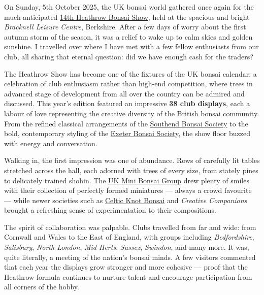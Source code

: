 \label{2025-10-show}
\noindent
On Sunday, 5th October 2025, the UK bonsai world gathered once again for the much\--anticipated \href{https://heathrowbonsai.weebly.com}{14th Heathrow Bonsai Show}, held at the spacious and bright \textit{Bracknell Leisure Centre}, Berkshire.
After a few days of worry about the first autumn storm of the season, it was a relief to wake up to calm skies and golden sunshine.
I travelled over where I have met with a few fellow enthusiasts from our club, all sharing that eternal question: did we have enough cash for the traders?

The Heathrow Show has become one of the fixtures of the UK bonsai calendar: a celebration of club enthusiasm rather than high\--end competition, where trees in advanced stage of development from all over the country can be admired and discussed.
This year's edition featured an impressive \textbf{38 club displays}, each a labour of love representing the creative diversity of the British bonsai community.
From the refined classical arrangements of the \href{https://www.southendbonsai.com}{Southend Bonsai Society} to the bold, contemporary styling of the \href{https://exeterbonsaisociety.com}{Exeter Bonsai Society}, the show floor buzzed with energy and conversation.

Walking in, the first impression was one of abundance.
Rows of carefully lit tables stretched across the hall, each adorned with trees of every size, from stately pines to delicately trained shohin.
The \href{https://ukminibonsaigroup.weebly.com}{UK Mini Bonsai Group} drew plenty of smiles with their collection of perfectly formed miniatures --- always a crowd favourite --- while newer societies such as \href{http://www.celticknotbonsai.co.uk}{Celtic Knot Bonsai} and \textit{Creative Companions} brought a refreshing sense of experimentation to their compositions.

The spirit of collaboration was palpable.
Clubs travelled from far and wide: from Cornwall and Wales to the East of England, with groups including \textit{Bedfordshire}, \textit{Salisbury}, \textit{North London}, \textit{Mid\--Herts}, \textit{Sussex}, \textit{Swindon}, and many more.
It was, quite literally, a meeting of the nation's bonsai minds.
A few visitors commented that each year the displays grow stronger and more cohesive --- proof that the Heathrow formula continues to nurture talent and encourage participation from all corners of the hobby.

